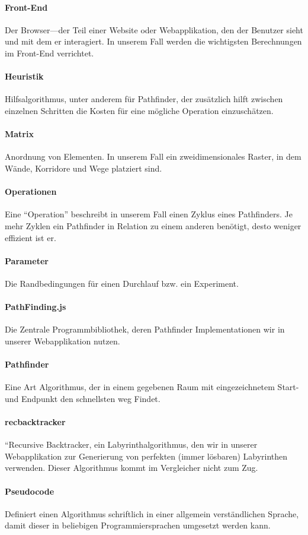 \documentclass[12pt,a4paper,german]{report}
\begin{document}
\paragraph{Front-End} Der Browser---der Teil einer Website oder Webapplikation, den der Benutzer sieht und mit dem er interagiert. In unserem Fall werden die wichtigsten Berechnungen im Front-End verrichtet.
\paragraph{Heuristik} Hilfsalgorithmus, unter anderem für Pathfinder, der zusätzlich hilft zwischen einzelnen Schritten die Kosten für eine mögliche Operation einzuschätzen.
\paragraph{Matrix} Anordnung von Elementen. In unserem Fall ein zweidimensionales Raster, in dem Wände, Korridore und Wege platziert sind.
\paragraph{Operationen} Eine ``Operation'' beschreibt in unserem Fall einen Zyklus eines Pathfinders. Je mehr Zyklen ein Pathfinder in Relation zu einem anderen benötigt, desto weniger effizient ist er.
\paragraph{Parameter} Die Randbedingungen für einen Durchlauf bzw. ein Experiment.
\paragraph{PathFinding.js} Die Zentrale Programmbibliothek, deren Pathfinder Implementationen wir in unserer Webapplikation nutzen.
\paragraph{Pathfinder} Eine Art Algorithmus, der in einem gegebenen Raum mit eingezeichnetem Start- und Endpunkt den schnellsten weg Findet.
\paragraph{recbacktracker} ``Recursive Backtracker, ein Labyrinthalgorithmus, den wir in unserer Webapplikation zur Generierung von perfekten (immer lösbaren) Labyrinthen verwenden. Dieser Algorithmus kommt im Vergleicher nicht zum Zug.
\paragraph{Pseudocode} Definiert einen Algorithmus schriftlich in einer allgemein verständlichen Sprache, damit dieser in beliebigen Programmiersprachen umgesetzt werden kann.
\end{document}
